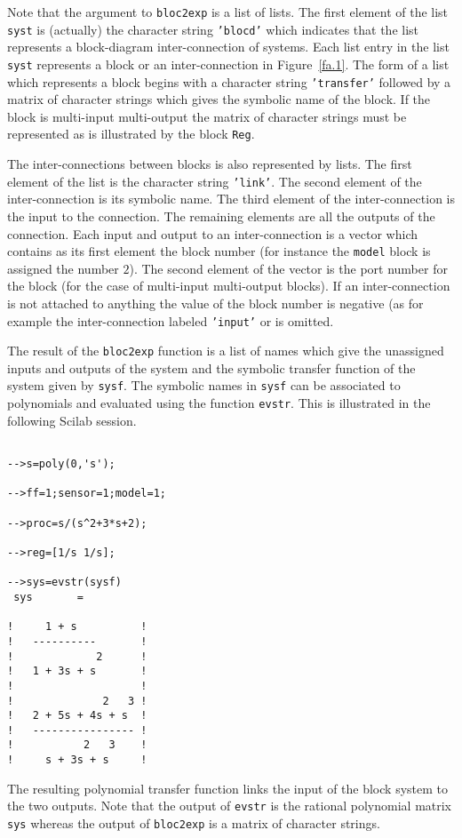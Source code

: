 %
Note that the argument to {\tt bloc2exp} is a list of lists.  The 
first element of the list {\tt syst} is (actually) the character string
{\tt 'blocd'} which indicates that the list represents a block-diagram
inter-connection of systems.  Each list entry in the list {\tt syst}
represents a block or an inter-connection in Figure~\ref{fa.1}.
The form of a list which represents a block begins with a character
string {\tt 'transfer'} followed by a matrix of character strings
which gives the symbolic name of the block.  If the block is multi-input
multi-output the matrix of character strings must be represented as
is illustrated by the block {\tt Reg}.  

	The inter-connections between blocks is also represented by lists.  
The first element of the list is the character string {\tt 'link'}.
The second element of the inter-connection is its symbolic name.
The third element of the inter-connection is the input to the connection.
The remaining elements are all the outputs of the connection.
Each input and output to an inter-connection is a vector which
contains as its first element the block number (for instance the {\tt model}
block is assigned the number $2$).  The second element of the vector
is the port number for the block (for the case of multi-input multi-output
blocks).  If an inter-connection is not attached to anything the value
of the block number is negative (as for example the inter-connection
labeled {\tt 'input'} or is omitted.

	The result of the {\tt bloc2exp} function is a list of names
which give the unassigned inputs and outputs of the system and
the symbolic transfer function of the system given by {\tt sysf}.
The symbolic names in {\tt sysf} can be associated to polynomials
and evaluated using the function {\tt evstr}.  This is illustrated in the
following Scilab session.
%
\begin{verbatim}
 
-->s=poly(0,'s');
 
-->ff=1;sensor=1;model=1;
 
-->proc=s/(s^2+3*s+2);
 
-->reg=[1/s 1/s];
 
-->sys=evstr(sysf)
 sys       =
 
!     1 + s          !
!   ----------       !
!             2      !
!   1 + 3s + s       !
!                    !
!              2   3 !
!   2 + 5s + 4s + s  !
!   ---------------- !
!           2   3    !
!     s + 3s + s     !

\end{verbatim}
%
The resulting polynomial transfer function links the input
of the block system to the two outputs.  Note that the output
of {\tt evstr} is the rational polynomial matrix {\tt sys}
whereas the output of {\tt bloc2exp} is a matrix of character strings.

